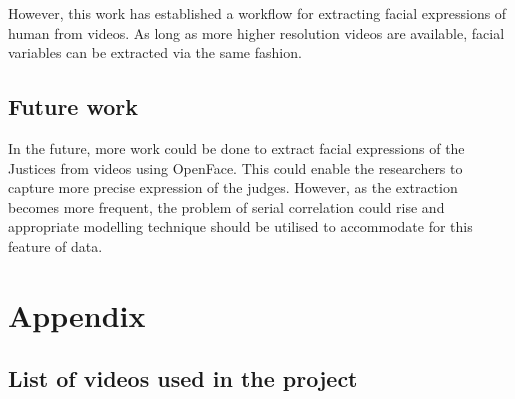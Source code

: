 \documentclass{monashthesis}
\begin{document}
However, this work has established a workflow for extracting facial expressions of human from videos. As long as more higher resolution videos are available, facial variables can be extracted via the same fashion.

\hypertarget{future-work}{%
\section{Future work}\label{future-work}}

In the future, more work could be done to extract facial expressions of the Justices from videos using OpenFace. This could enable the researchers to capture more precise expression of the judges. However, as the extraction becomes more frequent, the problem of serial correlation could rise and appropriate modelling technique should be utilised to accommodate for this feature of data.

\appendix

\hypertarget{appendix}{%
\chapter{Appendix}\label{appendix}}

\hypertarget{list-of-videos-used-in-the-project}{%
\section{List of videos used in the project}\label{list-of-videos-used-in-the-project}}
\end{document}

